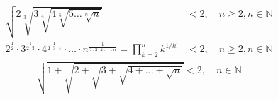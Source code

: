\documentclass[a4paper,11pt]{article}
\begin{document}
\begin{equation}
    \begin{aligned}
        \sqrt{2\sqrt[3]{3\sqrt[4]{4\sqrt[5]{5\dots\sqrt[n]{n}}}}} &< 2, \quad n\geq2,n\in\mathbb{N} \\
        2^{\frac{1}{2}} \cdot 3^{\frac{1}{2\cdot3}} \cdot 4^{\frac{1}{2\cdot3\cdot4}} \cdot \ldots \cdot n^{{\frac{1}{2\cdot3\cdot4\cdot\ldots\cdot n}}} = \prod_{k=2}^n k^{1/k!} &< 2, \quad n\geq2,n\in\mathbb{N}
    \end{aligned}
\end{equation}
\vspace{13pt}
\begin{equation}
    \begin{aligned}
        \sqrt{1+\sqrt{2+\sqrt{3+\sqrt{4+\dots+\sqrt{n}}}}} < 2, \quad n\in\mathbb{N}
    \end{aligned}
\end{equation}
\vspace{13pt}
\end{document}

